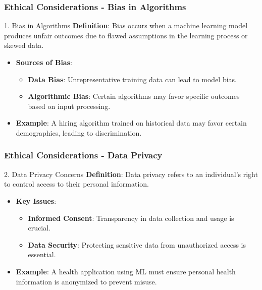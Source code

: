 \documentclass[aspectratio=169]{beamer}
\begin{document}
\begin{frame}[fragile]
    \frametitle{Ethical Considerations - Bias in Algorithms}
    \begin{block}{1. Bias in Algorithms}
        \textbf{Definition}: Bias occurs when a machine learning model produces unfair outcomes due to flawed assumptions in the learning process or skewed data.
        
        \begin{itemize}
            \item \textbf{Sources of Bias}:
            \begin{itemize}
                \item \textbf{Data Bias}: Unrepresentative training data can lead to model bias.
                \item \textbf{Algorithmic Bias}: Certain algorithms may favor specific outcomes based on input processing.
            \end{itemize}
            \item \textbf{Example}: A hiring algorithm trained on historical data may favor certain demographics, leading to discrimination.
        \end{itemize}
    \end{block}
\end{frame}

\begin{frame}[fragile]
    \frametitle{Ethical Considerations - Data Privacy}
    \begin{block}{2. Data Privacy Concerns}
        \textbf{Definition}: Data privacy refers to an individual's right to control access to their personal information.
        
        \begin{itemize}
            \item \textbf{Key Issues}:
            \begin{itemize}
                \item \textbf{Informed Consent}: Transparency in data collection and usage is crucial.
                \item \textbf{Data Security}: Protecting sensitive data from unauthorized access is essential.
            \end{itemize}
            \item \textbf{Example}: A health application using ML must ensure personal health information is anonymized to prevent misuse.
        \end{itemize}
    \end{block}
\end{frame}
\end{document}
